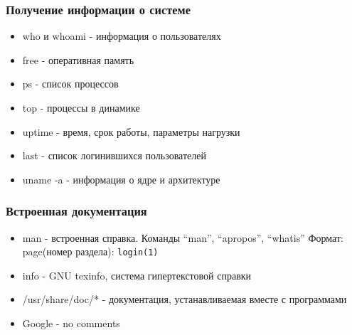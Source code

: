 \begin{frame}
  \frametitle{Получение информации о системе}
  \begin{itemize}
    \item \Large{who} и \Large{whoami} - информация о пользователях \pause
    \item \Large{free} - оперативная память \pause
    \item \Large{ps} - список процессов \pause
    \item \Large{top} - процессы в динамике \pause
    \item \Large{uptime} - время, срок работы, параметры нагрузки \pause
    \item \Large{last} - список логинившихся пользователей \pause
    \item \Large{uname -a} - информация о ядре и архитектуре
  \end{itemize}
\end{frame}

\begin{frame}[fragile]
  \frametitle{Встроенная документация}
  \begin{itemize}
    \item \Large{\alert{man}} - встроенная справка. Команды ``man'', ``apropos'', ``whatis''
      \newline Формат: \alert{page(номер раздела)}:  \verb+login(1)+\pause
    \item \alert{info - GNU texinfo}, система гипертекстовой справки \pause
    \item \alert{/usr/share/doc/*} - документация, устанавливаемая вместе с программами \pause
    \item \alert{Google} - no comments \pause
  \end{itemize}

\end{frame}


